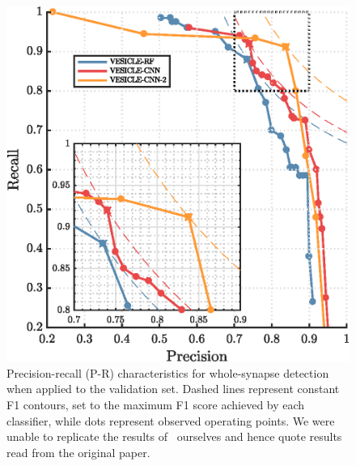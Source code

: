 \documentclass{article}
\begin{document}
\begin{figure}

 \begin{minipage}[h]{\linewidth}
 	\centering
	\includegraphics[width=\textwidth]{figures/f1_sweep_comparison_synapse.eps}
	\caption{Precision-recall (P-R) characteristics for whole-synapse detection when applied to the validation set. Dashed lines represent constant F1 contours, set to the maximum F1 score achieved by each classifier, while dots represent observed operating points. We were unable to replicate the results of~\citet{roncal2014vesicle} ourselves and hence quote results read from the original paper.}
	\label{fig:obj_pr}
  \end{minipage}

\vspace*{0.5cm}


\end{figure}
\end{document}

